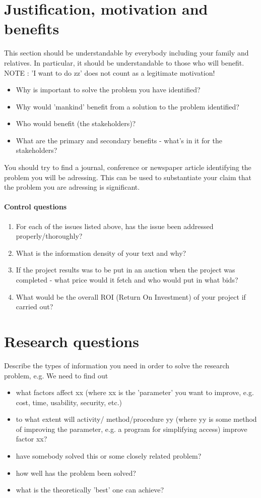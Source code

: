 \section{Justification, motivation and benefits}
This section should be understandable by everybody including your family and relatives.
In particular, it should be understandable to those who will benefit.
NOTE : 'I want to do zz' does not count as a legitimate motivation!
\begin{itemize}
\item Why is important to solve the problem you have identified?
\item Why would 'mankind' benefit from a solution to the problem identified?
\item Who would benefit (the stakeholders)?
\item What are the primary and secondary benefits - what's in it for the stakeholders?
\end{itemize}
You should try to find a journal, conference or newspaper article identifying the problem you will be adressing.
This can be used to substantiate your claim that the problem you are adressing is significant.

\paragraph{Control questions}
\begin{enumerate}
\item For each of the issues listed above, has the issue been addressed properly/thoroughly? 
\item What is the information density of your text and why?
\item If the project results was to be put in an auction when the project was completed - what price would it fetch and who would put in what bids? 
\item What would be the overall ROI (Return On Investment) of your project if carried out?
\end{enumerate}

\section{Research questions}\label{research:questions}
Describe the types of information you need in order to solve the research problem, e.g.
We need to find out
\begin{itemize}
\item what factors affect  xx (where xx is the 'parameter' you want to improve, e.g. cost, time, usability, security, etc.)
\item to what extent will activity/ method/procedure yy (where yy is some method of improving the parameter, e.g.  a program for simplifying access) improve factor xx?
\item have somebody solved this or some closely related problem?
\item how well has the problem been solved?
\item what is the theoretically 'best' one can achieve?
\end{itemize}

